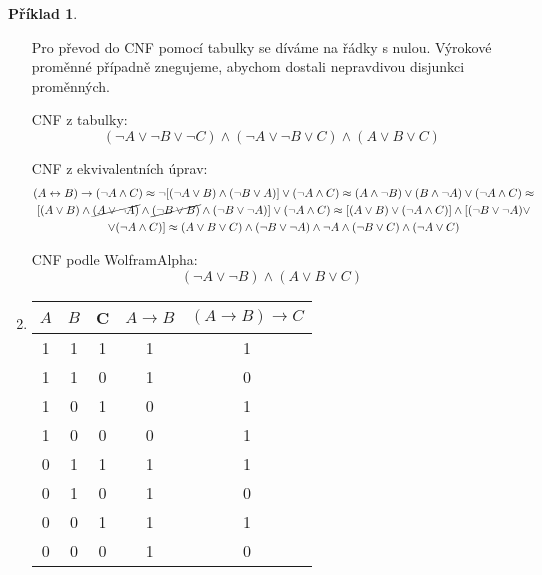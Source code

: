 \documentclass[a4paper]{article}
\theoremstyle{definition}
\newtheorem{priklad}{Příklad}
\begin{document}
\begin{priklad}
\begin{enumerate}
        Pro převod do CNF pomocí tabulky se díváme na řádky s nulou. Výrokové proměnné případně znegujeme, abychom dostali nepravdivou disjunkci proměnných.
        
        CNF z tabulky:
        \[ (\neg A\vee \neg B\vee \neg C)\wedge (\neg A\vee \neg B \vee C)\wedge (A\vee B\vee C) \]
        
        CNF z ekvivalentních úprav: 
        {      
        \begin{multline*}
        (A \leftrightarrow B)\rightarrow (\neg A\wedge C) \approx \neg [(\neg A\vee B)\wedge (\neg B\vee A)]\vee (\neg A\wedge C) \approx (A\wedge \neg B)\vee (B\wedge \neg A) \vee (\neg A\wedge C) \approx\\
         [(A\vee B)\wedge \cancel{(A\vee \neg A)}\wedge \cancel{(\neg B\vee B)}\wedge (\neg B\vee \neg A)]\vee (\neg A\wedge C) \approx [(A\vee B)\vee (\neg A\wedge C)]\wedge [(\neg B\vee \neg A)\vee \\
         \vee (\neg A\wedge C)] \approx 
         (A\vee B\vee C) \wedge (\neg B\vee \neg A)\wedge \neg A \wedge (\neg B\vee C) \wedge (\neg A\vee C)
        \end{multline*}
        }
        
        CNF podle WolframAlpha:
        \[ (\neg A\vee \neg B)\wedge (A\vee B\vee C) \]
        
        \item
        
            \begin{tabular}{|c|c|c|c|c|}
                \hline 
                 $ A $ & $ B $ & C & $ A\rightarrow B $ & $ (A\rightarrow B)\rightarrow C $ \\
                 \hline 
                 1 & 1 & 1 & 1 & 1 \\ 
                 1 & 1 & 0 & 1 & 0 \\ 
                 1 & 0 & 1 & 0 & 1 \\ 
                 1 & 0 & 0 & 0 & 1 \\ 
                 0 & 1 & 1 & 1 & 1 \\ 
                 0 & 1 & 0 & 1 & 0 \\ 
                 0 & 0 & 1 & 1 & 1 \\ 
                 0 & 0 & 0 & 1 & 0 \\
                 \hline
            \end{tabular}
    

\end{enumerate}
\end{priklad}
\end{document}
